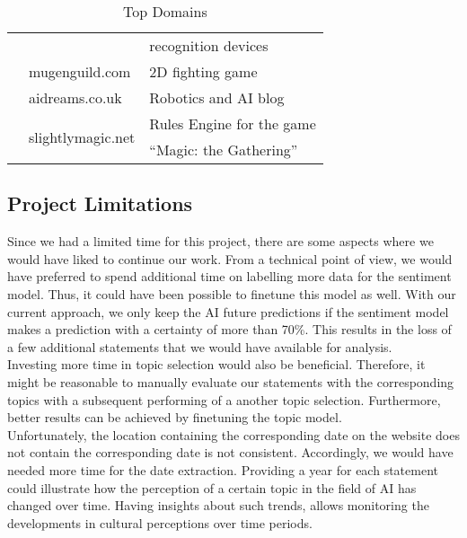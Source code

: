 \begin{table}
{\begin{tabular}{rll}
                                  &                                         & recognition devices\\
        \addlinespace[0.7em]
        {58\quad}                 & mugenguild.com                          & 2D fighting game \\
        \addlinespace[0.7em]
        {52\quad}                 & aidreams.co.uk                          & Robotics and AI blog\\
        \addlinespace[0.7em]
        \multirow{2}{*}{51\quad}  & \multirow{2}{*}{slightlymagic.net}      & Rules Engine for the game \\
                                  &                                         & ``Magic: the Gathering'' \\
        \bottomrule
    \end{tabular}
    }
\caption{\label{Top-Domains}
Top Domains
}
\end{table}
\subsection{Project Limitations}

Since we had a limited time for this project, there are some aspects where we would have liked to continue our work.
From a technical point of view, we would have preferred to spend additional time on labelling more data for the sentiment model.
Thus, it could have been possible to finetune this model as well.
With our current approach, we only keep the AI future predictions if the sentiment model makes a prediction with a certainty of more than 70\%.
This results in the loss of a few additional statements that we would have available for analysis.
\\
Investing more time in topic selection would also be beneficial.
Therefore, it might be reasonable to manually evaluate our statements with the corresponding topics with a subsequent performing of a another topic selection.
Furthermore, better results can be achieved by finetuning the topic model.
\\
Unfortunately, the location containing the corresponding date on the website does not contain the corresponding date is not consistent.
Accordingly, we would have needed more time for the date extraction.
Providing a year for each statement could illustrate how the perception of a certain topic in the field of AI has changed over time.
Having insights about such trends, allows monitoring the developments in cultural perceptions over time periods.
\\





